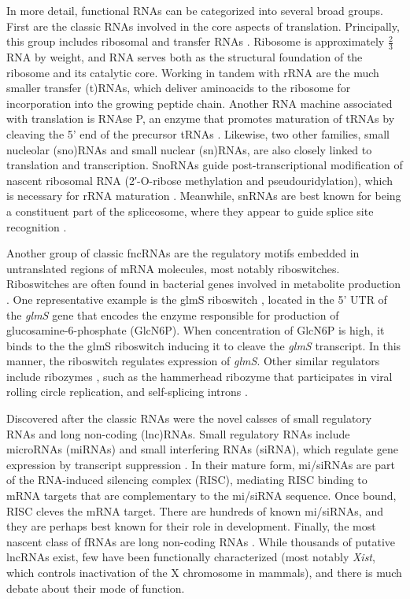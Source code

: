 \documentclass[12pt,a4paper]{report}
\begin{document}
In more detail, functional RNAs can be categorized into several broad groups. First are the classic RNAs involved in the core aspects of translation. Principally, this group includes ribosomal and transfer RNAs \cite{Beringer2007}. Ribosome is approximately $\frac{2}{3}$ RNA by weight, and RNA serves both as the structural foundation of the ribosome and its catalytic core. Working in tandem with rRNA are the much smaller transfer (t)RNAs, which deliver aminoacids to the ribosome for incorporation into the growing peptide chain. Another RNA machine associated with translation is RNAse P, an enzyme that promotes maturation of tRNAs by cleaving the 5' end of the precursor tRNAs \cite{Altman1983, Alfonso2013}. Likewise, two other families, small nucleolar (sno)RNAs and small nuclear (sn)RNAs, are also closely linked to translation and transcription. SnoRNAs guide post-transcriptional modification of nascent ribosomal RNA (2′-O-ribose methylation and pseudouridylation), which is necessary for rRNA maturation \cite{Mattick2005}. Meanwhile, snRNAs are best known for being a constituent part of the spliceosome, where they appear to guide splice site recognition \cite{Valadkhan2013}.

Another group of classic fncRNAs are the regulatory motifs embedded in untranslated regions of mRNA molecules, most notably riboswitches. Riboswitches are often found in bacterial genes involved in metabolite production \cite{Garst2015}. One representative example is the glmS riboswitch \cite{Klein2006}, located in the 5' UTR of the \textit{glmS} gene that encodes the enzyme responsible for production of glucosamine-6-phosphate (GlcN6P). When concentration of GlcN6P is high, it binds to the the glmS riboswitch inducing it to cleave the \textit{glmS} transcript. In this manner, the riboswitch regulates expression of \textit{glmS}. Other similar regulators include ribozymes \cite{Hammann2012}, such as the hammerhead ribozyme that participates in viral rolling circle replication, and self-splicing introns \cite{Lambowitz2011}. 

Discovered after the classic RNAs were the novel calsses of small regulatory RNAs and long non-coding (lnc)RNAs. Small regulatory RNAs include microRNAs (miRNAs) and small interfering RNAs (siRNA), which regulate gene expression by transcript suppression \cite{Mattick2005}. In their mature form, mi/siRNAs are part of the RNA-induced silencing complex (RISC), mediating RISC binding to mRNA targets that are complementary to the mi/siRNA sequence. Once bound, RISC cleves the mRNA target. There are hundreds of known mi/siRNAs, and they are perhaps best known for their role in development. Finally, the most nascent class of fRNAs are long non-coding RNAs \cite{Mercer2009}. While thousands of putative lncRNAs exist, few have been functionally characterized (most notably \textit{Xist}, which controls inactivation of the X chromosome in mammals), and there is much debate about their mode of function.
\end{document}
